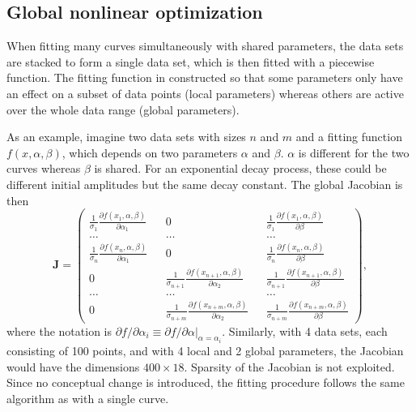 \documentclass{article}
\begin{document}
\subsection{Global nonlinear optimization}

When fitting many curves simultaneously with shared parameters, the data sets are stacked to form a single data set, which is then fitted with a piecewise function. The fitting function in constructed so that some parameters only have an effect on a subset of data points (local parameters) whereas others are active over the whole data range (global parameters).

As an example, imagine two data sets with sizes $n$ and $m$ and a fitting function $f(x,\alpha,\beta)$, which depends on two parameters $\alpha$ and $\beta$. $\alpha$ is different for the two curves whereas $\beta$ is shared. For an exponential decay process, these could be different initial amplitudes but the same decay constant. The global Jacobian is then
\begin{equation}
  \label{eq:globalJacob}
  \bm J =
  \left( \begin{matrix}
      \frac{1}{\sigma_1} \frac{\partial f(x_1, \alpha, \beta)}
      {\partial\alpha_1} && 0 && \frac{1}{\sigma_1} \frac{\partial
        f(x_1, \alpha, \beta)} {\partial\beta} \\
      \ldots && \ldots && \ldots \\
      \frac{1}{\sigma_n} \frac{\partial f(x_n, \alpha, \beta)}
      {\partial\alpha_1} && 0 && \frac{1}{\sigma_n} \frac{\partial
        f(x_n, \alpha, \beta)} {\partial\beta} \\
      0 && \frac{1}{\sigma_{n+1}} \frac{\partial f(x_{n+1}, \alpha,
        \beta)} {\partial\alpha_2} && \frac{1}{\sigma_{n+1}}
      \frac{\partial f(x_{n+1}, \alpha, \beta)} {\partial\beta} \\
      \ldots && \ldots && \ldots \\
      0 && \frac{1}{\sigma_{n+m}} \frac{\partial f(x_{n+m}, \alpha,
        \beta)} {\partial\alpha_2} && \frac{1}{\sigma_{n+m}}
      \frac{\partial f(x_{n+m}, \alpha, \beta)} {\partial\beta}
    \end{matrix} \right),
\end{equation}
where the notation is $\partial f / \partial\alpha_i \equiv \partial f / \partial\alpha |_{\alpha = \alpha_i}$. Similarly, with 4 data sets, each consisting of 100 points, and with 4 local and 2 global parameters, the Jacobian would have the dimensions $400\times18$. Sparsity of the Jacobian is not exploited. Since no conceptual change is introduced, the fitting procedure follows the same algorithm as with a single curve.
\end{document}
